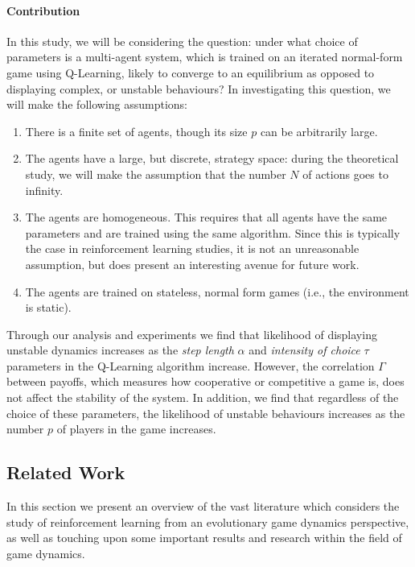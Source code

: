\documentclass[sigconf,anonymous]{aamas}
\begin{document}
\paragraph{Contribution}
In this study, we will be considering the question: under what choice
of parameters is a multi-agent system, which is trained on an iterated normal-form game using Q-Learning, likely to converge to an equilibrium as opposed
to displaying complex, or unstable behaviours? In investigating this
question, we will make the following assumptions:

\begin{enumerate}
    \item There is a finite set of agents, though its size $p$ can be
      arbitrarily large.
      
    \item The agents have a large, but discrete, strategy space:
      during the theoretical study, we will make the assumption that
      the number $N$ of actions goes to infinity.

  \item The agents are homogeneous. This requires that all agents have
    the same parameters and are trained using the same
    algorithm. Since this is typically the case in reinforcement
    learning studies, it is not an unreasonable assumption, but does
    present an interesting avenue for future work.

  \item The agents are trained on stateless, normal form games
    (i.e., the environment is static).
\end{enumerate}

Through our analysis and experiments we find that likelihood of
displaying unstable dynamics increases as the \textit{step length}
$\alpha$ and \textit{intensity of choice} $\tau$ parameters in the
Q-Learning algorithm
increase. However, the
correlation $\Gamma$ between payoffs, which measures how cooperative
or competitive a game is, does not affect the stability of the
system. In addition, we find that regardless of the choice of these
parameters, the likelihood of unstable behaviours increases as the
number  $p$ of players in the game increases.

\subsection*{Related Work}

In this section we present an overview of the vast literature which
considers the study of reinforcement learning from an evolutionary
game dynamics perspective, as well as touching upon some important
results and research within the field of game dynamics.
\end{document}
